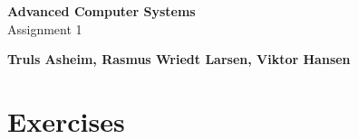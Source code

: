 \documentclass[11pt,a4paper,english]{article}
\begin{document}
\thispagestyle{empty} %
\hspace{6cm} \vspace{6cm}
\begin{center}
\textbf{\Huge {Advanced Computer Systems}}\\ \vspace{0.5cm}
\Large{Assignment 1}
\end{center}
\vspace{3cm}
\begin{center}
\Large{\textbf{Truls Asheim, Rasmus Wriedt Larsen, Viktor Hansen}}
\end{center}
\vspace{6.0cm}
\thispagestyle{empty}

\newpage

\section{Exercises}
\end{document}

